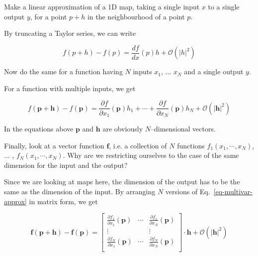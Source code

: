 \begin{cue}
Make a linear approximation of a 1D map, taking a single input $x$ to a single output $y$, for a point $p+h$ in the neighbourhood of a point $p$.  
\end{cue}

By truncating a Taylor series, we can write

\begin{equation}
f(p+h) - f(p) = \frac{df}{dx}(p)h + \mathcal{O}\left(|h|^2\right)
\end{equation} 

\begin{cue}
Now do the same for a function having $N$ inputs $x_1$, ... $x_N$ and a single output $y$.  
\end{cue}

For a function with multiple inputs, we get

\begin{equation}
  f(\mathbf{p}+\mathbf{h}) - f(\mathbf{p}) = \frac{\partial f}{\partial x_1}(\mathbf p)h_1+ \cdots +  \frac{\partial f}{\partial x_N}(\mathbf p)h_N+ \mathcal{O}\left(|\mathbf{h}|^2\right)
  \label{eq-multivar-approx}
\end{equation} 

In the equations above $\mathbf p$ and $\mathbf h$ are obviously $N$--dimensional vectors.

\begin{cue}
Finally, look at a vector function $\mathbf f$, i.e. a collection of $N$ functions $f_1(x_1, \cdots, x_N)$, ... , $f_N(x_1, \cdots, x_N)$. Why are we restricting ourselves to the case of the same dimension for the input and the output?
\end{cue}

Since we are looking at maps here, the dimension of the output has to be the same as the dimension of the input. By arranging $N$ versions of Eq.~\ref{eq-multivar-approx} in matrix form, we get

\begin{equation}
{\mathbf f}({\mathbf p} + {\mathbf h}) - {\mathbf f}({\mathbf p}) = \begin{bmatrix}
\frac{\partial f_1}{\partial x_1}({\mathbf p}) & \cdots & \frac{\partial f_1}{\partial x_N}({\mathbf p}) \\
\vdots & & \vdots \\
\frac{\partial f_N}{\partial x_1}({\mathbf p}) & \cdots & \frac{\partial f_N}{\partial x_N}({\mathbf p}) \\
\end{bmatrix} \cdot {\mathbf h} + \mathcal{O}\left(|{\mathbf h}|^2\right)
  \label{eq-jacobian}
\end{equation}


